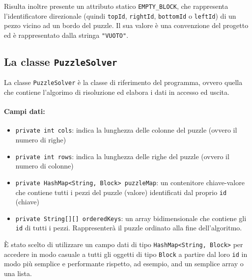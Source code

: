 Risulta inoltre presente un attributo statico \texttt{EMPTY\_BLOCK}, che rappresenta l'identificatore direzionale (quindi \texttt{topId}, \texttt{rightId}, \texttt{bottomId} o \texttt{leftId}) di un pezzo vicino ad un bordo del puzzle. Il sua valore è una convenzione del progetto ed è rappresentato dalla stringa \texttt{"VUOTO"}.

\subsection{La classe \texttt{PuzzleSolver}}
La classe \texttt{PuzzleSolver} è la classe di riferimento del programma, ovvero quella che contiene l'algorimo di risoluzione ed elabora i dati in accesso ed uscita. 

\paragraph{Campi dati:}
\begin{itemize}
\item \texttt{private int cols}: indica la lunghezza delle colonne del puzzle (ovvero il numero di righe)
\item \texttt{private int rows}: indica la lunghezza delle righe del puzzle (ovvero il numero di colonne)
\item \texttt{private HashMap<String, Block> puzzleMap}: un contenitore chiave-valore che contiene tutti i pezzi del puzzle (valore) identificati dal proprio \texttt{id} (chiave)
\item \texttt{private String[][] orderedKeys}: un array bidimensionale che contiene gli \texttt{id} di tutti i pezzi. Rappresenterà il puzzle ordinato alla fine dell'algoritmo.
\end{itemize} 

\`{E} stato scelto di utilizzare un campo dati di tipo \texttt{HashMap<String, Block>} per accedere in modo casuale a tutti gli oggetti di tipo \texttt{Block} a partire dal loro \texttt{id} in modo più semplice e performante rispetto, ad esempio, and un semplice array o una lista.

